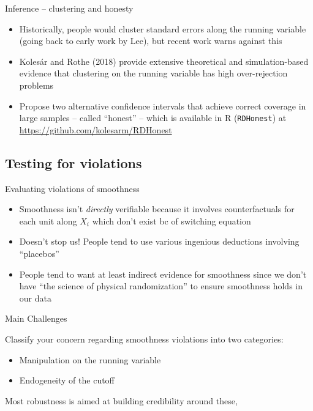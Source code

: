\documentclass{beamer}
\begin{document}
\begin{frame}{Inference -- clustering and honesty}

\begin{itemize}
\item Historically, people would cluster standard errors along the running variable (going back to early work by Lee), but recent work warns against this
\item Koles\'ar and Rothe (2018) provide extensive theoretical and simulation-based evidence that clustering on the running variable has high over-rejection problems
\item Propose two alternative confidence intervals that achieve correct coverage in large samples -- called ``honest'' -- which is available in R (\texttt{RDHonest}) at \url{https://github.com/kolesarm/RDHonest}
\end{itemize}

\end{frame}

\subsection{Testing for violations}

\begin{frame}{Evaluating violations of smoothness}

\begin{itemize}
\item Smoothness isn't \emph{directly} verifiable because it involves counterfactuals for each unit along $X_i$ which don't exist bc of switching equation
\item Doesn't stop us!  People tend to use various ingenious deductions involving ``placebos''
\item People tend to want at least indirect evidence for smoothness since we don't have ``the science of physical randomization'' to ensure smoothness holds in our data
\end{itemize}

\end{frame}


\begin{frame}{Main Challenges}

Classify your concern regarding smoothness violations into two categories:
\begin{itemize}
\item Manipulation on the running variable 
\item Endogeneity of the cutoff
\end{itemize}Most robustness is aimed at building credibility around these, 

\end{frame}
\end{document}
